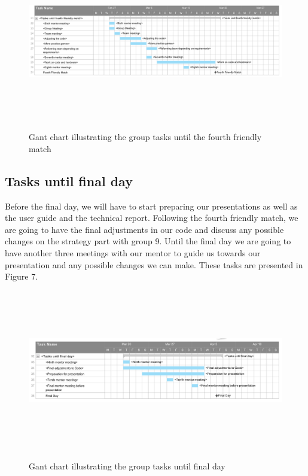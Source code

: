 \documentclass{article}
\begin{document}
\begin{figure}[H]
	\centering
	\begin{minipage}{1\textwidth}
		\centering
		\includegraphics[width=16cm, height=7cm]{FourthFriendlyMatch.png}\\
		\caption{Gant chart illustrating the group tasks until the fourth friendly match}
	\end{minipage}%
\end{figure}

\subsection{Tasks until final day}
Before the final day, we will have to start preparing our presentations as well as the user guide and the technical report. Following the fourth friendly match, we are going to have the final adjustments in our code and discuss any possible changes on the strategy part with group 9. Until the final day we are going to have another three meetings with our mentor to guide us towards our presentation and any possible changes we can make. These tasks are presented in Figure 7.
\begin{figure}[H]
	\centering
	\begin{minipage}{1\textwidth}
		\centering
		\includegraphics[width=16cm, height=7cm]{FinalDay.png}\\
		\caption{Gant chart illustrating the group tasks until final day}
	\end{minipage}%
\end{figure}
\end{document}

